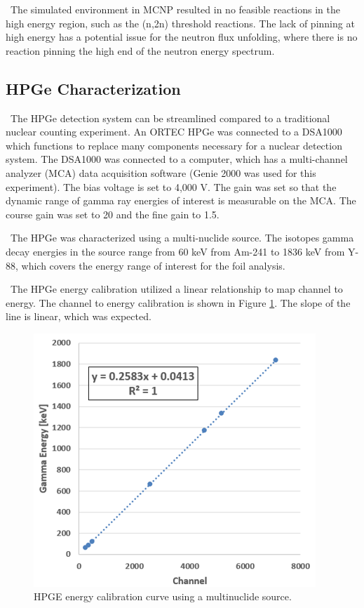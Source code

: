 \documentclass[journal]{IEEEtran}
\let\MYoriglatexcaption\caption
\renewcommand{\caption}[2][\relax]{\MYoriglatexcaption[#2]{#2}}
\begin{document}
	\ The simulated environment in MCNP resulted in no feasible reactions in the high energy region, such as the (n,2n) threshold reactions. 
The lack of pinning at high energy has a potential issue for the neutron flux unfolding, where there is no reaction pinning the high end of the neutron energy spectrum. 
	
	\subsection{HPGe Characterization}
	
	\ The HPGe detection system can be streamlined compared to a traditional nuclear counting experiment. 
An ORTEC HPGe was connected to a DSA1000 which functions to replace many components necessary for a nuclear detection system. 
The DSA1000 was connected to a computer, which has a multi-channel analyzer (MCA) data acquisition software (Genie 2000 was used for this experiment). 
The bias voltage is set to 4,000 V. 
The gain was set so that the dynamic range of gamma ray energies of interest is measurable on the MCA. 
The course gain was set to 20 and the fine gain to 1.5. 
	
	\ The HPGe was characterized using a multi-nuclide source. 
The isotopes gamma decay energies in the source range from 60 keV from Am-241 to 1836 keV from Y-88, which covers the energy range of interest for the foil analysis. 
	
	\ The HPGe energy calibration utilized a linear relationship to map channel to energy. 
The channel to energy calibration is shown in Figure \ref{fig:ecal}. 
The slope of the line is linear, which was expected. 
	
	\begin{figure}[h]
		\includegraphics[width=\linewidth]{Figures/ECal.png}
		\caption{HPGE energy calibration curve using a multinuclide source.}
		\label{fig:ecal}
	\end{figure}
	
\end{document}
